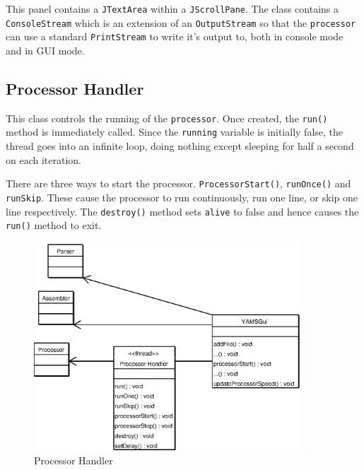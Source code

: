 This panel contains a {\tt JTextArea} within a {\tt JScrollPane}.  The class contains a {\tt ConsoleStream} which is an extension of an {\tt OutputStream} so that the {\tt processor} can use a standard {\tt PrintStream} to write it's output to, both in console mode and in GUI mode.



\subsection{Processor Handler}

This class controls the running of the {\tt processor}. Once created, the {\tt run()} method is immediately called. Since the {\tt running} variable is initially false, the thread goes into an infinite loop, doing nothing except sleeping for half a second on each iteration.

There are three ways to start the processor.  {\tt ProcessorStart()}, {\tt runOnce()} and {\tt runSkip}. These cause the processor to run continuously, run one line, or skip one line respectively.  The {\tt destroy()} method sets {\tt alive} to false and hence causes the {\tt run()} method to exit.


\begin{figure}[htbp]
\begin{center}
\includegraphics[width=10cm]{ProcessorHandler.eps}
\end{center}
\caption{Processor Handler}
\label{figLineList}
\end{figure}

